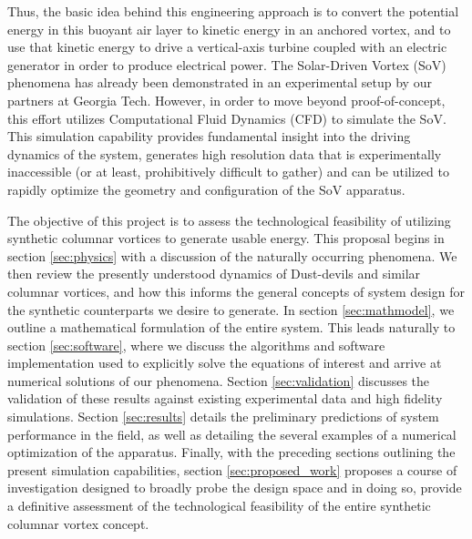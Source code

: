 Thus, the basic idea behind this engineering approach is to convert the 
potential energy in this buoyant air layer to kinetic energy in an
anchored vortex, and to use that kinetic energy to drive a
vertical-axis turbine coupled with an electric generator in order to
produce electrical power. 
The Solar-Driven Vortex (SoV) phenomena has already been demonstrated in
an experimental setup by our partners at Georgia Tech. However, in order to 
move beyond proof-of-concept, this effort utilizes Computational Fluid 
Dynamics (CFD) to simulate the SoV. This simulation capability provides 
fundamental insight into the 
driving dynamics of the system, generates high resolution data that is 
experimentally inaccessible (or at least, prohibitively difficult to gather) 
and can be utilized to rapidly optimize the geometry and configuration of 
the SoV apparatus. 


%
%

The objective of this project is to assess the technological feasibility of 
utilizing synthetic columnar vortices to generate usable energy. 
This proposal begins in section \ref{sec:physics} with a discussion of the 
naturally occurring phenomena. We then
review the presently understood dynamics of Dust-devils and similar
columnar vortices, and how this informs the general concepts of system 
design for the synthetic counterparts we desire to generate. 
In section \ref{sec:mathmodel}, we outline a mathematical formulation of
the entire system. This leads naturally to section \ref{sec:software},
where we discuss the algorithms and software implementation used to
explicitly solve the equations of interest and arrive at numerical
solutions of our phenomena. Section \ref{sec:validation} discusses the
validation of these results against existing experimental data and high
fidelity simulations. Section \ref{sec:results} details the preliminary
predictions of system performance in the field, as well as detailing the 
several examples of a numerical optimization of the apparatus. Finally, with the 
preceding sections outlining the present simulation capabilities, 
section \ref{sec:proposed_work} proposes a course of investigation
designed to broadly probe the design space and in doing so, provide a
definitive assessment of the technological feasibility of the entire 
synthetic columnar vortex concept. 



